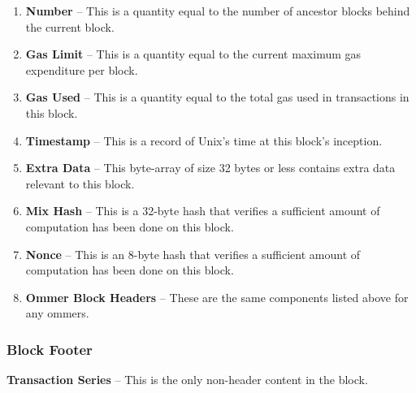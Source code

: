 \documentclass[10pt,a4paper,leqno,bibliography=totoc]{scrartcl}
\newenvironment{alphafootnotes}
{\par\edef\savedfootnotenumber{\number\value{footnote}}
\renewcommand{\thefootnote}{\alph{footnote}}
\setcounter{footnote}{0}}
{\par\setcounter{footnote}{\savedfootnotenumber}}
\begin{document}
\begin{alphafootnotes}
\begin{multicols*}{2}
\begin{enumerate}
					\item \textbf{Number} -- This is a quantity equal to the number of ancestor blocks behind the current block.
					\item \textbf{Gas Limit} -- This is a quantity equal to the current maximum gas expenditure per block.
					\item \textbf{Gas Used} -- This is a quantity equal to the total gas used in transactions in this block.
					\item \textbf{Timestamp} -- This is a record of Unix's time at this block's inception.
					

					\item \textbf{Extra Data} -- This byte-array of size 32 bytes or less contains extra data relevant to this block.
					\item \textbf{Mix Hash} -- This is a 32-byte hash that verifies a sufficient amount of computation has been done on this block.
					\item \textbf{Nonce} -- This is an 8-byte hash that verifies a sufficient amount of computation has been done on this block.
					\item \textbf{Ommer Block Headers} -- These are the same components listed above for any ommers.
				

					\end{enumerate}
				
					\subsubsection{Block Footer}
					\item \textbf{Transaction Series} -- This is the only non-header content in the block.
					

\end{multicols*}
\end{alphafootnotes}
\end{document}
